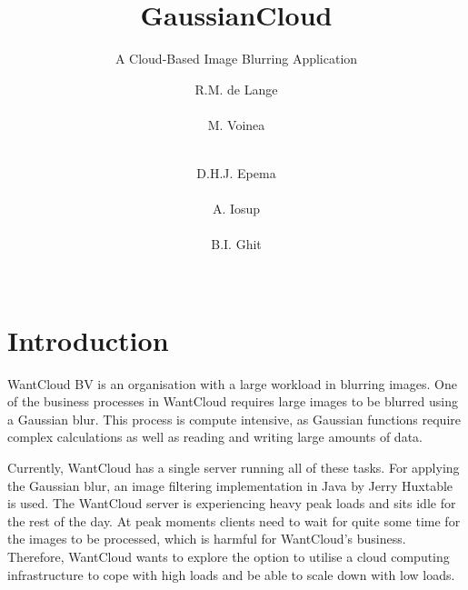 \documentclass{acm_proc_article-sp}
\begin{document}
\title{GaussianCloud}
\subtitle{A Cloud-Based Image Blurring Application}

\author{
\alignauthor
R.M. de Lange\\
		\\
\alignauthor
M. Voinea\\
		\\
\and
\alignauthor
D.H.J. Epema\\
		\\
\alignauthor
A. Iosup\\
		\\
\alignauthor
B.I. Ghit\\
		\\
}

\maketitle

\begin{abstract}
\end{abstract}

\section{Introduction}
\label{sec:intro}
WantCloud BV is an organisation with a large workload in blurring images.
One of the business processes in WantCloud requires large images to be blurred using a Gaussian blur.
This process is compute intensive, as Gaussian functions require complex calculations as well as reading and writing large amounts of data.

Currently, WantCloud has a single server running all of these tasks.
For applying the Gaussian blur, an image filtering implementation in Java by Jerry Huxtable is used.\cite{web:huxtable}
The WantCloud server is experiencing heavy peak loads and sits idle for the rest of the day.
At peak moments clients need to wait for quite some time for the images to be processed, which is harmful for WantCloud's business.
Therefore, WantCloud wants to explore the option to utilise a cloud computing infrastructure to cope with high loads and be able to scale down with low loads.
\end{document}

